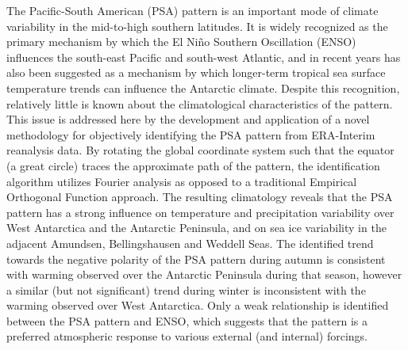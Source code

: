 The Pacific-South American (PSA) pattern is an important mode of climate variability in the mid-to-high southern latitudes. It is widely recognized as the primary mechanism by which the El Ni\~{n}o Southern Oscillation (ENSO) influences the south-east Pacific and south-west Atlantic, and in recent years has also been suggested as a mechanism by which longer-term tropical sea surface temperature trends can influence the Antarctic climate. Despite this recognition, relatively little is known about the climatological characteristics of the pattern. This issue is addressed here by the development and application of a novel methodology for objectively identifying the PSA pattern from ERA-Interim reanalysis data. By rotating the global coordinate system such that the equator (a great circle) traces the approximate path of the pattern, the identification algorithm utilizes Fourier analysis as opposed to a traditional Empirical Orthogonal Function approach. The resulting climatology reveals that the PSA pattern has a strong influence on temperature and precipitation variability over West Antarctica and the Antarctic Peninsula, and on sea ice variability in the adjacent Amundsen, Bellingshausen and Weddell Seas. The identified trend towards the negative polarity of the PSA pattern during autumn is consistent with warming observed over the Antarctic Peninsula during that season, however a similar (but not significant) trend during winter is inconsistent with the warming observed over West Antarctica. Only a weak relationship is identified between the PSA pattern and ENSO, which suggests that the pattern is a preferred atmospheric response to various external (and internal) forcings.